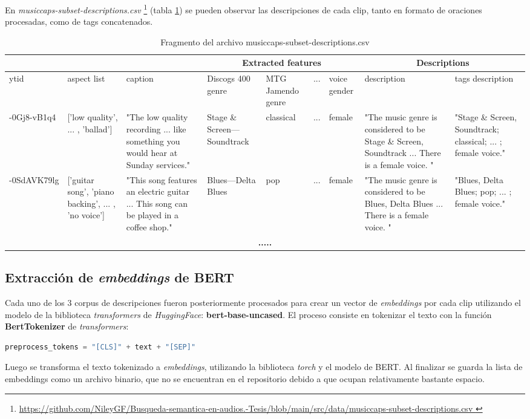 En \textit{musiccaps-subset-descriptions.csv} \footnote{\href{https://github.com/NileyGF/Busqueda-semantica-en-audios.-Tesis/blob/main/src/data/musiccaps-subset-descriptions.csv} {https://github.com/NileyGF/Busqueda-semantica-en-audios.-Tesis/blob/main/src/data/musiccaps-subset-descriptions.csv } } (tabla \ref{tab:descriptions.csv})  se pueden observar las descripciones de cada clip, tanto en formato de oraciones procesadas, como de tags concatenados. 
\begin{table} [h]
    \tiny
    \centering
    \begin{tabular} { | p{5em} | p{4em} | p{6em} | p{4em} | p{4em} | c | p{4em} | p{6em} | p{6em} |}
    \hline
     \multicolumn{3}{|c|}{ } & \multicolumn{4}{|c|}{Extracted features} & \multicolumn{2}{|c|}{Descriptions} \\
    \hline
        ytid    & aspect list & caption &Discogs 400 genre & MTG Jamendo genre & ... & voice gender & description & tags description \\ 
    \hline
    -0Gj8-vB1q4 &['low quality', ... , 'ballad'] &"The low quality recording ... like something you would hear at Sunday services." & Stage \& Screen---Soundtrack & classical & ... & female &"The music genre is considered to be Stage \& Screen, Soundtrack ... There is a female voice. " &"Stage \& Screen, Soundtrack; classical; ... ; female voice."\\
    \hline
    -0SdAVK79lg &['guitar song', 'piano backing', ... , 'no voice'] &"This song features an electric guitar ... This song can be played in a coffee shop."  & Blues---Delta Blues & pop & ... & female &"The music genre is considered to be Blues, Delta Blues ... There is a female voice. " &"Blues, Delta Blues; pop; ... ; female voice."\\
    \hline
    \multicolumn{9}{|c|}{ \textbf{.....} } \\ 
    \hline
    \end{tabular}
    \caption{Fragmento del archivo musiccaps-subset-descriptions.csv}
    \label{tab:descriptions.csv}
\end{table}

\subsection{Extracción de \textit{embeddings} de BERT}
\label{subsec:bert-embedd-extr}

Cada uno de los 3 corpus de descripciones fueron posteriormente procesados para crear un vector de \textit{embeddings} por cada clip utilizando el modelo de la biblioteca \textit{transformers} de \textit{HuggingFace}: \textbf{bert-base-uncased}. El proceso consiste en tokenizar el texto con la función \textbf{BertTokenizer} de \textit{transformers}: \\
\begin{lstlisting}[language=Python]
preprocess_tokens = "[CLS]" + text + "[SEP]"
\end{lstlisting} 
Luego se transforma el texto tokenizado a \textit{embeddings}, utilizando la biblioteca \textit{torch} y el modelo de BERT. Al finalizar se guarda la lista de embeddings como un archivo binario, que no se encuentran en el repositorio debido a que ocupan relativamente bastante espacio.


